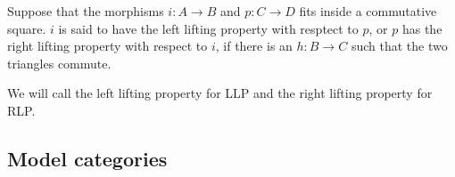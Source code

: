\documentclass[../thesis.tex]{subfiles}
\begin{document}
        \begin{definition}
            Suppose that the morphisms $i: A \rightarrow B$ and $p: C \rightarrow D$ fits inside a commutative square. $i$ is said to have the left lifting property with resptect to $p$, or $p$ has the right lifting property with respect to $i$, if there is an $h : B \rightarrow C$ such that the two triangles commute.
            \begin{center}
            \end{center}
        \end{definition}

        \begin{remark}
            We will call the left lifting property for LLP and the right lifting property for RLP.
        \end{remark}

        \subsection{Model categories}
\end{document}
